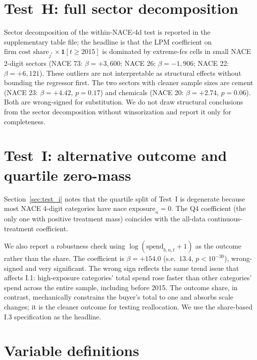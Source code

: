 \section{Test~H: full sector decomposition}\label{app:test_h_sectors}

Sector decomposition of the within-NACE-4d test is reported in the supplementary table file; the headline is that the LPM coefficient on $\text{firm cost share}_{j^*} \times \mathbf{1}[t \geq 2015]$ is dominated by extreme-fcs cells in small NACE 2-digit sectors (NACE 73: $\beta = +3{,}600$; NACE 26: $\beta = -1{,}906$; NACE 22: $\beta = +6{,}121$). These outliers are not interpretable as structural effects without bounding the regressor first. The two sectors with cleaner sample sizes are cement (NACE 23: $\beta = +4.42$, $p = 0.17$) and chemicals (NACE 20: $\beta = +2.74$, $p = 0.06$). Both are wrong-signed for substitution. We do not draw structural conclusions from the sector decomposition without winsorization and report it only for completeness.

\section{Test~I: alternative outcome and quartile zero-mass}\label{app:test_i_alt}

Section~\ref{sec:test_i} notes that the quartile split of Test~I is degenerate because most NACE 4-digit categories have $\text{nace exposure}_n = 0$. The Q4 coefficient (the only one with positive treatment mass) coincides with the all-data continuous-treatment coefficient.

We also report a robustness check using $\log(\text{spend}_{b,n,t} + 1)$ as the outcome rather than the share. The coefficient is $\beta = +154.0$ (s.e.\ $13.4$, $p < 10^{-30}$), wrong-signed and very significant. The wrong sign reflects the same trend issue that affects I.1: high-exposure categories' total spend rose faster than other categories' spend across the entire sample, including before 2015. The outcome share, in contrast, mechanically constrains the buyer's total to one and absorbs scale changes; it is the cleaner outcome for testing reallocation. We use the share-based I.3 specification as the headline.

\section{Variable definitions}\label{app:variables}

